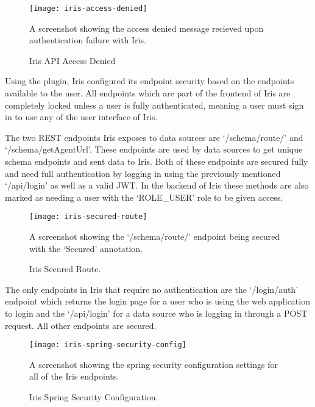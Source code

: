 \documentclass[12pt,a4paper,titlepage]{report}
\begin{document}
\begin{figure}[H]
\begin{tcolorbox}
\begin{center}
\texttt{[image: iris-access-denied]}
\end{center}
A screenshot showing the access denied message recieved upon authentication failure with Iris.
\end{tcolorbox}
\caption{Iris API Access Denied}
\end{figure}

Using the plugin, Iris configured its endpoint security based on the endpoints available to the user. All endpoints which are part of the frontend of Iris are completely locked unless a user is fully authenticated, meaning a user must sign in to use any of the user interface of Iris.

The two REST endpoints Iris exposes to data sources are `/schema/route/' and `/schema/getAgentUrl'. These endpoints are used by data sources to get unique schema endpoints and sent data to Iris. Both of these endpoints are secured fully and need full authentication by logging in using the previously mentioned `/api/login' as well as a valid JWT. In the backend of Iris these methods are also marked as needing a user with the `ROLE\_USER' role to be given access.

\begin{figure}[H]
\begin{tcolorbox}
\begin{center}
\texttt{[image: iris-secured-route]}
\end{center}
A screenshot showing the `/schema/route/' endpoint being secured with the `Secured' annotation.
\end{tcolorbox}
\caption{Iris Secured Route.}
\end{figure}

The only endpoints in Iris that require no authentication are the `/login/auth' endpoint which returns the login page for a user who is using the web application to login and the `/api/login' for a data source who is logging in through a POST request. All other endpoints are secured.

\begin{figure}[H]
\begin{tcolorbox}
\begin{center}
\texttt{[image: iris-spring-security-config]}
\end{center}
A screenshot showing the spring security configuration settings for all of the Iris endpoints.
\end{tcolorbox}
\caption{Iris Spring Security Configuration.}
\end{figure}
\end{document}
